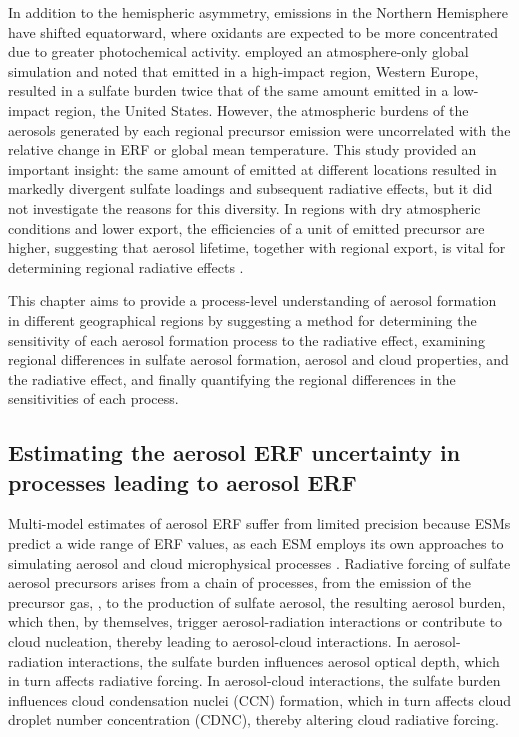 In addition to the hemispheric asymmetry, emissions in the Northern Hemisphere have shifted equatorward, where oxidants are expected to be more concentrated due to greater photochemical activity. \citet{persadDivergentGlobalscaleTemperature2018} employed an atmosphere-only global simulation and noted that  emitted in a high-impact region, Western Europe, resulted in a sulfate burden twice that of the same amount emitted in a low-impact region, the United States. However, the atmospheric burdens of the aerosols generated by each regional precursor emission were uncorrelated with the relative change in ERF or global mean temperature. This study provided an important insight: the same amount of  emitted at different locations resulted in markedly divergent sulfate loadings and subsequent radiative effects, but it did not investigate the reasons for this diversity. In regions with dry atmospheric conditions and lower export, the efficiencies of a unit of emitted precursor are higher, suggesting that aerosol lifetime, together with regional export, is vital for determining regional radiative effects \citep{yangGlobalSourceAttribution2017}. 

This chapter aims to provide a process-level understanding of aerosol formation in different geographical regions by suggesting a method for determining the sensitivity of each aerosol formation process to the radiative effect, examining regional differences in sulfate aerosol formation, aerosol and cloud properties, and the radiative effect, and finally quantifying the regional differences in the sensitivities of each process.

\subsection{Estimating the aerosol ERF uncertainty in processes leading to aerosol ERF}

Multi-model estimates of aerosol ERF suffer from limited precision because ESMs predict a wide range of ERF values, as each ESM employs its own approaches to simulating aerosol and cloud microphysical processes \citep{forsterEarthEnergyBudget2021,thornhillEffectiveRadiativeForcing2021}. Radiative forcing of sulfate aerosol precursors arises from a chain of processes, from the emission of the precursor gas, , to the production of sulfate aerosol, the resulting aerosol burden, which then, by themselves, trigger aerosol-radiation interactions or contribute to cloud nucleation, thereby leading to aerosol-cloud interactions. In aerosol-radiation interactions, the sulfate burden influences aerosol optical depth, which in turn affects radiative forcing. In aerosol-cloud interactions, the sulfate burden influences cloud condensation nuclei (CCN) formation, which in turn affects cloud droplet number concentration (CDNC), thereby altering cloud radiative forcing. 

